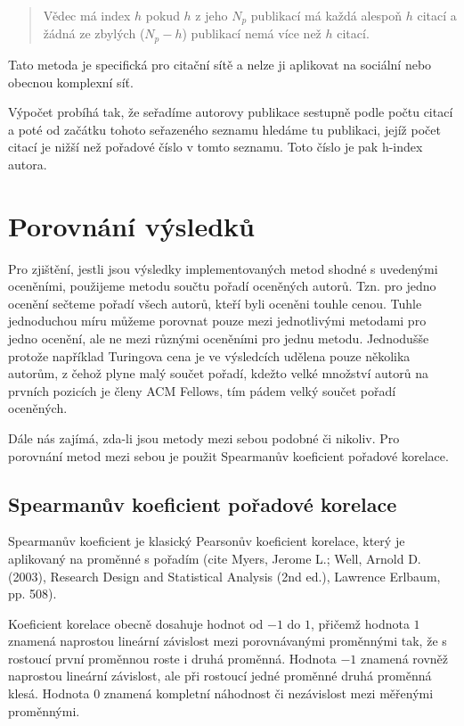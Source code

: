 \documentclass[12pt,titlepage]{report}
\begin{document}
\begin{quotation}
Vědec má index $h$ pokud $h$ z jeho $N_p$ publikací má každá alespoň $h$ citací
a žádná ze zbylých ($N_p - h$) publikací nemá více než $h$ citací.
\end{quotation}

Tato metoda je specifická pro citační sítě a nelze ji aplikovat na sociální
nebo obecnou komplexní síť.

Výpočet probíhá tak, že seřadíme autorovy publikace sestupně podle počtu citací
a poté od začátku tohoto seřazeného seznamu hledáme tu publikaci, jejíž počet
citací je nižší než pořadové číslo v tomto seznamu. Toto číslo je pak h-index
autora.

\section{Porovnání výsledků}
Pro zjištění, jestli jsou výsledky implementovaných metod shodné s uvedenými
oceněními, použijeme metodu součtu pořadí oceněných autorů. Tzn. pro jedno
ocenění sečteme pořadí všech autorů, kteří byli oceněni touhle cenou. Tuhle
jednoduchou míru můžeme porovnat pouze mezi jednotlivými metodami pro jedno
ocenění, ale ne mezi různými oceněními pro jednu metodu. Jednodušše protože
například Turingova cena je ve výsledcích udělena pouze několika autorům, z
čehož plyne malý součet pořadí, kdežto velké množství autorů na prvních
pozicích je členy ACM Fellows, tím pádem velký součet pořadí oceněných.


Dále nás zajímá, zda-li jsou metody mezi sebou podobné či nikoliv. Pro
porovnání metod mezi sebou je použit Spearmanův koeficient pořadové korelace.

\subsection{Spearmanův koeficient pořadové korelace}
Spearmanův koeficient je klasický Pearsonův koeficient korelace, který je
aplikovaný na proměnné s pořadím (cite Myers, Jerome L.; Well, Arnold D.
(2003), Research Design and Statistical Analysis (2nd ed.), Lawrence Erlbaum,
pp. 508).

Koeficient korelace obecně dosahuje hodnot od $-1$ do $1$, přičemž hodnota $1$
znamená naprostou lineární závislost mezi porovnávanými proměnnými tak, že s
rostoucí první proměnnou roste i druhá proměnná. Hodnota $-1$ znamená rovněž
naprostou lineární závislost, ale při rostoucí jedné proměnné druhá proměnná
klesá. Hodnota $0$ znamená kompletní náhodnost či nezávislost mezi měřenými
proměnnými.
\end{document}
